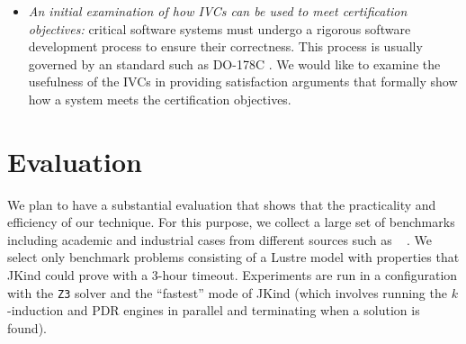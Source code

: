 \begin{itemize}
\item \emph{An initial examination of how IVCs can be used to meet certification objectives:}  critical software systems must undergo a rigorous software development process to ensure their correctness. This process is usually governed by an standard such as DO-178C \cite{DO178C}. We would like to examine the usefulness of the IVCs in providing satisfaction arguments that formally show how a system meets the certification objectives.

\end{itemize}

\section{Evaluation}
We plan to have a substantial evaluation that shows that the practicality and efficiency of our technique. For this purpose, we collect a large set of benchmarks including academic and industrial cases from different sources such as ~\cite{Hagen08:FMCAD, piskac2016} \cite{hilt2013} \cite{piskac2016, NFM2015:backes}. We select only benchmark problems consisting of a Lustre model with
properties that JKind could prove with a 3-hour timeout.
Experiments are run in a configuration with the \texttt{Z3} solver and the ``fastest'' mode of JKind (which involves running the $k$-induction and PDR engines in parallel and terminating when a solution is found).


